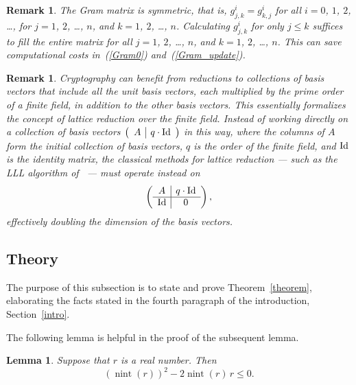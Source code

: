 \documentclass{article}
\newtheorem{lemma}[theorem]{Lemma}
\newtheorem{remark1}[theorem]{Remark}
\newenvironment{remark}{\begin{remark1} \rm}{\end{remark1}}
\DeclareMathOperator{\nint}{nint}
\def\Id{\rm Id}
\begin{document}
\begin{remark}
The Gram matrix is symmetric, that is, $g^i_{j,k} = g^i_{k,j}$
for all $i = 0$, $1$, $2$, \dots,
for $j = 1$, $2$, \dots, $n$, and $k = 1$, $2$, \dots, $n$.
Calculating $g^i_{j,k}$ for only $j \le k$ suffices to fill the entire matrix
for all $j = 1$, $2$, \dots, $n$, and $k = 1$, $2$, \dots, $n$.
This can save computational costs in~(\ref{Gram0}) and~(\ref{Gram_update}).
\end{remark}

\begin{remark}
Cryptography can benefit from reductions to collections of basis vectors
that include all the unit basis vectors, each multiplied by the prime order
of a finite field, in addition to the other basis vectors.
This essentially formalizes the concept of lattice reduction
over the finite field. 
Instead of working directly on a collection of basis vectors
$\left( \begin{array}{c|c} A & q \cdot \Id \end{array} \right)$
in this way, where the columns of $A$ form the initial collection
of basis vectors, $q$ is the order of the finite field,
and $\Id$ is the identity matrix, the classical methods for lattice reduction
--- such as the LLL algorithm of~\cite{lenstra-lenstra-lovasz} ---
must operate instead on 
%
\begin{equation}
\left( \begin{array}{c|c} A   & q \cdot \Id \\\hline
                          \Id & 0           \end{array} \right),
\end{equation}
%
effectively doubling the dimension of the basis vectors.
\end{remark}


\subsection{Theory}
\label{theory}

The purpose of this subsection is to state and prove Theorem~\ref{theorem},
elaborating the facts stated in the fourth paragraph of the introduction,
Section~\ref{intro}.

The following lemma is helpful in the proof of the subsequent lemma.
%
\begin{lemma}
Suppose that $r$ is a real number. Then
%
\begin{equation}
\label{simplified}
(\nint(r))^2 - 2 \nint(r) \, r \le 0.
\end{equation}
%
\end{lemma}
\end{document}
